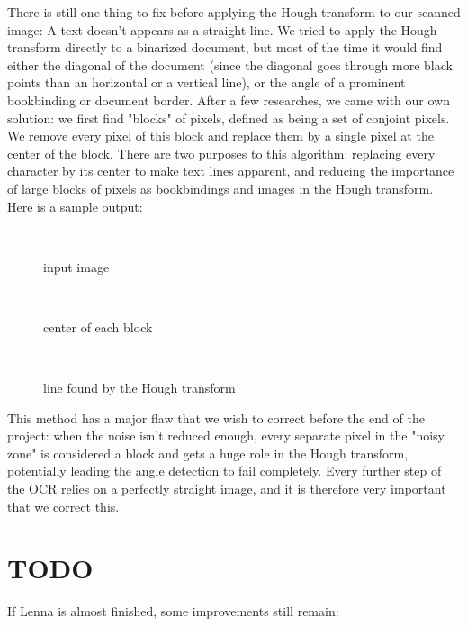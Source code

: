 \documentclass[12pt]{report}
\begin{document}
There is still one thing to fix before applying the Hough transform to our
scanned image: A text doesn't appears as a straight line. We tried to apply the
Hough transform directly to a binarized document, but most of the time it would
find either the diagonal of the document (since the diagonal goes through more
black points than an horizontal or a vertical line), or the angle of a prominent
bookbinding or document border. After a few researches, we came with our own
solution: we first find "blocks" of pixels, defined as being a set of conjoint
pixels. We remove every pixel of this block and replace them by a single pixel
at the center of the block. There are two purposes to this algorithm: replacing
every character by its center to make text lines apparent, and reducing the
importance of large blocks of pixels as bookbindings and images in the Hough
transform. Here is a sample output:\\

\begin{figure}[h!]\
    \centering
    \caption{input image}
\end{figure}
\begin{figure}[h!]\
    \centering
    \caption{center of each block}
\end{figure}
\begin{figure}[h!]\
    \centering
    \caption{line found by the Hough transform}
\end{figure}

This method has a major flaw that we wish to correct before the end of the
project: when the noise isn't reduced enough, every separate pixel in the
"noisy zone" is considered a block and gets a huge role in the Hough transform,
potentially leading the angle detection to fail completely. Every further step
of the OCR relies on a perfectly straight image, and it is therefore very
important that we correct this. \\

\section{TODO}

If Lenna is almost finished, some improvements still remain:
\end{document}

